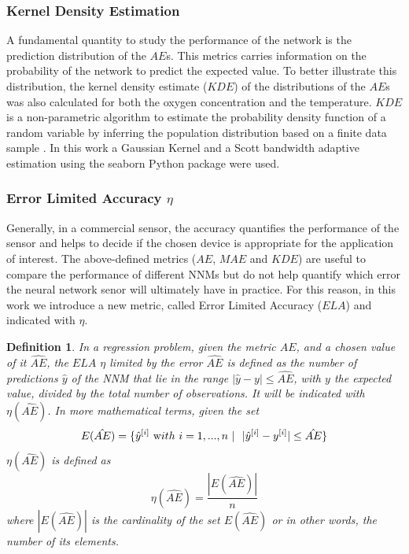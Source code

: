 \documentclass[final,5p,times,twocolumn]{elsarticle}
\newtheorem*{definition*}{Definition}
\begin{document}
\subsubsection{Kernel Density Estimation}

A fundamental quantity to study the performance of the network is the prediction distribution of the $AE$s. This metrics carries information on the probability of the network to predict the expected value. To better illustrate this distribution, the kernel density estimate ($KDE$) of the distributions of the $AE$s was also calculated for both the oxygen concentration and the temperature. $KDE$ is a non-parametric algorithm to estimate the probability density function of a random variable by inferring the population distribution based on a finite data sample \cite{Hastie2009}.  In this work a Gaussian Kernel and a Scott bandwidth adaptive estimation \cite{Sain1996} using the seaborn Python package \cite{Waskom2020} were used.


\subsubsection{Error Limited Accuracy $\eta$}
\label{sektion:ela}

Generally, in a commercial sensor, the accuracy quantifies the performance of the sensor and helps to decide if the chosen device is appropriate for the application of interest. The above-defined metrics ($AE$, $MAE$ and $KDE$) are useful to compare the performance of different NNMs but do not help quantify which error the neural network senor will ultimately have in practice.
For this reason, in this work we introduce a new metric, called Error Limited Accuracy ($ELA$) and indicated with $\eta$.

\begin{definition*}
In a regression problem, given the metric $AE$, and a chosen value of it $\hat{AE}$, the $ELA$  $\eta$ limited by the error $\hat{AE}$ is defined as the number of predictions $\hat y$ of the NNM that lie in the range $|\hat y-y|\leq \hat{AE}$, with $y$ the expected value, divided by the total number of observations. It will be indicated with $\eta(\hat{AE})$. In more mathematical terms, given the set
\begin{equation}
E(\hat{AE}) = \{ \hat y^{[i]} \ {\text with } \ i = 1,..., n\ | \ \ |\hat y^{[i]}-y^{[i]}|\leq \hat{AE} \} 
\end{equation}
$\eta(\hat{AE})$ is defined as
\begin{equation}
\eta(\hat{AE}) = \frac{|E(\hat{AE})|}{n}
\end{equation}
where $|E(\hat{AE})|$ is the cardinality of the set $E(\hat{AE})$ or in other words, the number of its elements.
\end{definition*}
\end{document}
